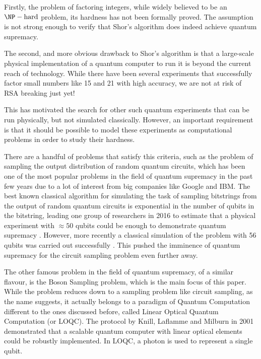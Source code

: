 \documentclass[ %
                    author={Manan Vaswani},
                supervisor={Dr. Raphael Clifford},
                    degree={MEng},
                     title={A multi-core CPU implementation of the classical Boson Sampling algorithm},
                  subtitle={},
                      type={},
                      year={2019} ]{dissertation}
\theoremstyle{plain}
\theoremstyle{definition}
\begin{document}
Firstly, the problem of factoring integers, while widely believed to be an $\NP-\text{hard}$ problem, its hardness has not been formally proved. The assumption is not strong enough to verify that Shor's algorithm does indeed achieve quantum supremacy.

The second, and more obvious drawback to Shor's algorithm is that a large-scale physical implementation of a quantum computer to run it is beyond the current reach of technology. While there have been several experiments that successfully factor small numbers like 15 \cite{monz2016} and 21 \cite{vartiainen2004} with high accuracy, we are not at risk of RSA breaking just yet!

This has motivated the search for other such quantum experiments that can be run physically, but not simulated classically. However, an important requirement is that it should be possible to model these experiments as computational problems in order to study their hardness.

There are a handful of problems that satisfy this criteria, such as the problem of sampling the output distribution of random quantum circuits, which has been one of the most popular problems in the field of quantum supremacy in the past few years due to a lot of interest from big companies like Google and IBM. The best known classical algorithm for simulating the task of sampling bitstrings from the output of random quantum circuits is exponential in the number of qubits in the bitstring, leading one group of researchers in 2016 to estimate that a physical experiment with $\approx 50$ qubits could be enough to demonstrate quantum supremacy \cite{boixo2016}. However, more recently a classical simulation of the problem with 56 qubits was carried out successfully \cite{pednault2017}. This pushed the imminence of quantum supremacy for the circuit sampling problem even further away.

The other famous problem in the field of quantum supremacy, of a similar flavour, is the Boson Sampling problem, which is the main focus of this paper. While the problem reduces down to a sampling problem like circuit sampling, as the name suggests, it actually belongs to a paradigm of Quantum Computation different to the ones discussed before, called Linear Optical Quantum Computation (or LOQC). The protocol by Knill, Laflamme and Milburn in 2001 \cite{knill2001} demonstrated that a scalable quantum computer with linear optical elements could be robustly implemented. In LOQC, a photon is used to represent a single qubit.
\end{document}
